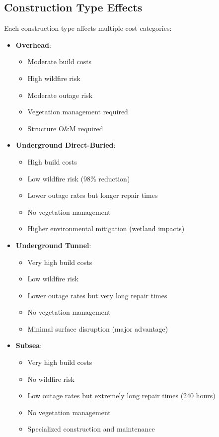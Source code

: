 \documentclass[ctcc_full_documentation.tex]{subfiles}
\begin{document}
\subsection{Construction Type Effects}

Each construction type affects multiple cost categories:

\begin{itemize}
    \item \textbf{Overhead}:
    \begin{itemize}
        \item Moderate build costs
        \item High wildfire risk
        \item Moderate outage risk
        \item Vegetation management required
        \item Structure O\&M required
    \end{itemize}
    
    \item \textbf{Underground Direct-Buried}:
    \begin{itemize}
        \item High build costs
        \item Low wildfire risk (98\% reduction)
        \item Lower outage rates but longer repair times
        \item No vegetation management
        \item Higher environmental mitigation (wetland impacts)
    \end{itemize}
    
    \item \textbf{Underground Tunnel}:
    \begin{itemize}
        \item Very high build costs
        \item Low wildfire risk
        \item Lower outage rates but very long repair times
        \item No vegetation management
        \item Minimal surface disruption (major advantage)
    \end{itemize}
    
    \item \textbf{Subsea}:
    \begin{itemize}
        \item Very high build costs
        \item No wildfire risk
        \item Low outage rates but extremely long repair times (240 hours)
        \item No vegetation management
        \item Specialized construction and maintenance
    \end{itemize}
\end{itemize}
\end{document}
